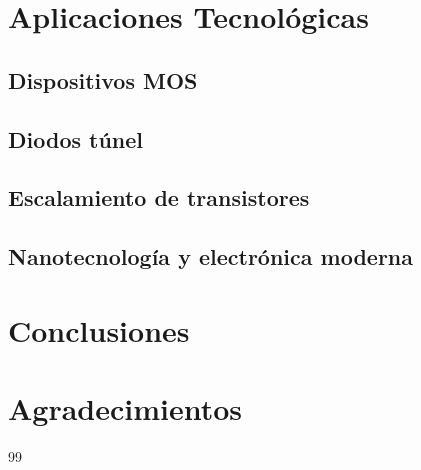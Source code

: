 \documentclass[12pt]{article}
\begin{document}
\section{Aplicaciones Tecnológicas}
\subsection{Dispositivos MOS}
\subsection{Diodos túnel}
\subsection{Escalamiento de transistores}
\subsection{Nanotecnología y electrónica moderna}

\section{Conclusiones}

\section*{Agradecimientos}

\begin{thebibliography}{99}
\end{thebibliography}
\end{document}
